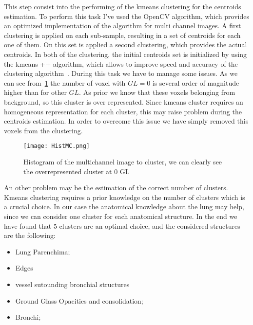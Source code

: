 		This step consist into the performing of the kmeans clustering for the centroids estimation. To perform this task I've used the OpenCV algorithm, which provides an optimized implementation of the algorithm for multi channel images. A first clustering is applied on each sub-sample, resulting in a set of centroids for each one of them. On this set is applied a second clustering, which provides the actual centroids. In both of the clustering, the initial centroids set is initialized by using the kmeans ++ algorithm, which allows to improve speed and accuracy of the clustering algorithm~\cite{Arthur2007}.
		During this task we have to manage some issues. As we can see from \figurename\,\ref{fig:ClusteringHistogram} the number of voxel with $GL = 0$  is several order of magnitude higher than for other $GL$. As prior we know that these voxels belonging from background, so this cluster is over represented. Since kmeans cluster requires an homogeneous representation for each cluster, this may raise problem during the centroids estimation. In order to overcome this issue we have simply removed this voxels from the clustering.  
		

		\begin{figure}[h!]
			\centering
				\texttt{[image: HistMC.png]}
					\label{fig:ClusteringHistogram}\caption{Histogram of the multichannel image to cluster, we can clearly see the overrepresented cluster at $0$ GL}
		\end{figure}
		
	An other problem may be the estimation of the correct number of clusters. Kmeans clustering requires a prior knowledge on the number of clusters which is a crucial choice. In our case the anatomical knowledge about the lung may help, since we can consider one cluster for each anatomical structure. In the end we have found that 5 clusters are an optimal choice, and the considered structures are the following: 
	\begin{itemize}
		\item Lung Parenchima;
		
		\item Edges
		
		\item vessel sutounding bronchial structures
		
		\item Ground Glass Opacities and consolidation;
		
		\item Bronchi;

	\end{itemize}

